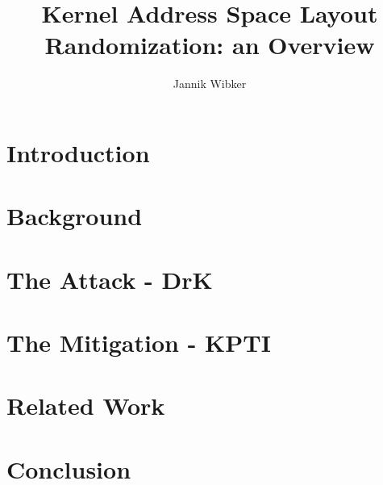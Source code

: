 \documentclass[10pt,twocolumn,a4paper]{article}
\author{Jannik Wibker}
\begin{document}
\title{ Kernel Address Space Layout Randomization: an Overview }

\newcommand{\todo}[1]{{\texttt{[#1]}}}
\newcommand{\code}[1]{{\tt \small{#1}}}

\maketitle

\begin{abstract}

\end{abstract}

\section{Introduction}\label{sec:introduction}



\section{Background}\label{sec:background}



\section{The Attack - DrK}\label{sec:drk}



\section{The Mitigation - KPTI}\label{sec:kpti}



\section{Related Work}\label{sec:relwork}



\section{Conclusion}\label{sec:conclusion}





\end{document}
